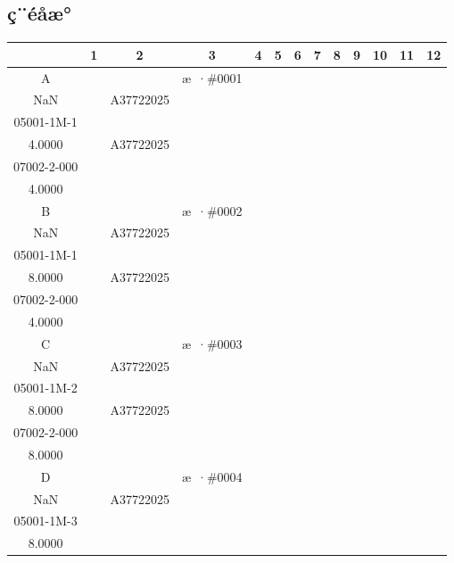 \documentclass[UTF8,10pt,a4paper,fontset=fandol]{ctexart}
\newcommand{\fieldvalue}[1]{#1}
\begin{document}
\subsection{ç¨éåæ°}

\begin{tabular}{c|*{12}{c|}}
 &1&2&3&4&5&6&7&8&9&10&11&12\\ \hline
A&&&%
\fieldvalue{\scriptsize æ ·\#0001\\NaN}&
&%
\fieldvalue{\scriptsize A37722025\\05001-1M-1\\4.0000}&
&%
\fieldvalue{\scriptsize A37722025\\07002-2-000\\4.0000}&
&&&&\\ \hline
B&&&%
\fieldvalue{\scriptsize æ ·\#0002\\NaN}&
&%
\fieldvalue{\scriptsize A37722025\\05001-1M-1\\8.0000}&
&%
\fieldvalue{\scriptsize A37722025\\07002-2-000\\4.0000}&
&&&&\\ \hline
C&&&%
\fieldvalue{\scriptsize æ ·\#0003\\NaN}&
&%
\fieldvalue{\scriptsize A37722025\\05001-1M-2\\8.0000}&
&%
\fieldvalue{\scriptsize A37722025\\07002-2-000\\8.0000}&
&&&&\\ \hline
D&&&%
\fieldvalue{\scriptsize æ ·\#0004\\NaN}&
&%
\fieldvalue{\scriptsize A37722025\\05001-1M-3\\8.0000}&
&%

\end{tabular}
\end{document}
